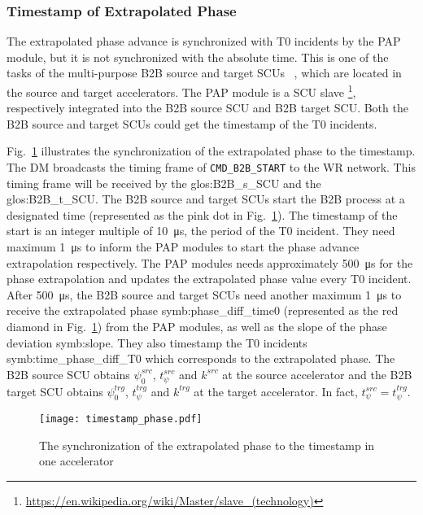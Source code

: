 \subsubsection{Timestamp of Extrapolated Phase}
The extrapolated phase advance is synchronized with T0 incidents by the PAP module, but it is not synchronized with the absolute time. This is one of the tasks of the multi-purpose B2B source and target SCUs ~\cite{beck_new_2012, thieme_scu_2013}, which are located in the source and target accelerators. The PAP module is a SCU slave \footnote{\url{https://en.wikipedia.org/wiki/Master/slave_(technology)}}, respectively integrated into the B2B source SCU and B2B target SCU. Both the B2B source and target SCUs could get the timestamp of the T0 incidents. 

Fig.~\ref{phase_diff_syn_time} illustrates the synchronization of the extrapolated phase to the timestamp. The DM broadcasts the timing frame of \verb|CMD_B2B_START| to the WR network. This timing frame will be received by the \gls{glos:B2B_s_SCU} and the \gls{glos:B2B_t_SCU}. The B2B source and target SCUs start the B2B process at a designated time (represented as the pink dot in Fig.~\ref{phase_diff_syn_time}). The timestamp of the start is an integer multiple of \SI{10}{\us}, the period of the T0 incident. They need maximum \SI{1}{\us} to inform the PAP modules to start the phase advance extrapolation respectively. The PAP modules needs approximately \SI{500}{\us} for the phase extrapolation and updates the extrapolated phase value every T0 incident. After \SI{500}{\us}, the B2B source and target SCUs need another maximum \SI{1}{\us} to receive the extrapolated phase \gls{symb:phase_diff_time0} (represented as the red diamond in Fig.~\ref{phase_diff_syn_time}) from the PAP modules, as well as the slope of the phase deviation \gls{symb:slope}. They also timestamp the T0 incidents \gls{symb:time_phase_diff_T0} which corresponds to the extrapolated phase. The B2B source SCU obtains $\psi^\mathit{src}_0$, $t_\psi^\mathit{src}$ and $k^\mathit{src}$ at the source accelerator and the B2B target SCU obtains $\psi^\mathit{trg}_0$, $t_\psi^\mathit{trg}$ and $k^\mathit{trg}$ at the target accelerator. In fact, $t_\psi^\mathit{src}=t_\psi^\mathit{trg}$.
 \begin{figure}[!htb]
   \centering   
   \texttt{[image: timestamp\_phase.pdf]}
   \caption{The synchronization of the extrapolated phase to the timestamp in one accelerator}
   \label{phase_diff_syn_time}
\end{figure}

